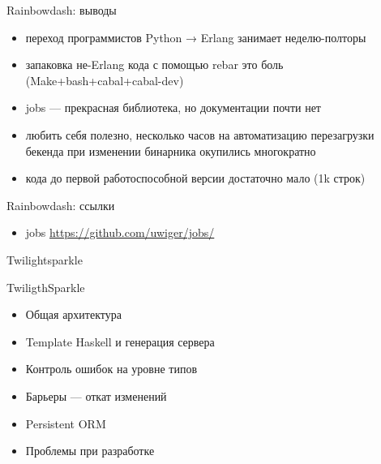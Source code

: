\documentclass[10pt]{beamer}
\begin{document}
\begin{frame}{Rainbowdash: выводы}
  \begin{itemize}
  \item переход программистов Python → Erlang занимает неделю-полторы
  \item запаковка не-Erlang кода с помощью rebar это боль (Make+bash+cabal+cabal-dev)
  \item jobs — прекрасная библиотека, но документации почти нет
  \item любить себя полезно, несколько часов на автоматизацию перезагрузки бекенда при изменении бинарника окупились многократно
  \item кода до первой работоспособной версии достаточно мало (1k строк)
  \end{itemize}
\end{frame}

\begin{frame}{Rainbowdash: ссылки}
  \begin{itemize}
  \item jobs \url{https://github.com/uwiger/jobs/}
  \end{itemize}
\end{frame}

\begin{frame}
  \begin{center}
    \Large
    Twilightsparkle
  \end{center}
\end{frame}

\begin{frame}{TwiligthSparkle}
\begin{itemize}
  \item Общая архитектура
  \item Template Haskell и генерация сервера
  \item Контроль ошибок на уровне типов
  \item Барьеры — откат изменений
  \item Persistent ORM
  \item Проблемы при разработке
\end{itemize}
\end{frame}
\end{document}
